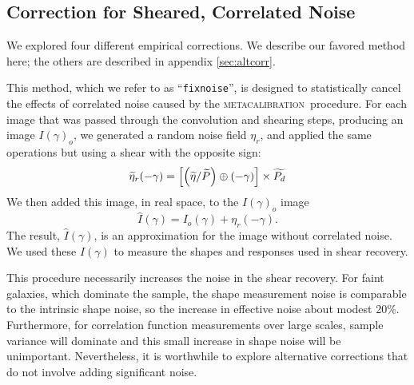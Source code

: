 \documentclass[iop]{emulateapj}
\newcommand{\mcal}{\textsc{metacalibration}}
\newcommand{\ntil}{\mbox{$\widetilde{\eta}$}}
\newcommand{\Ptil}{\mbox{$\widetilde{P}$}}
\newcommand{\Ptild}{\mbox{$\widetilde{P_d}$}}
\newcommand{\fixnoise}{\texttt{fixnoise}}
\begin{document}


\subsection{Correction for Sheared, Correlated Noise} \label{sec:fixnoise}


We explored four different empirical corrections.  We describe our favored
method here; the others are described in appendix \ref{sec:altcorr}.

This method, which we refer to as ``\fixnoise'', is designed to statistically
cancel the effects of correlated noise caused by the \mcal\ procedure.  For each
image that was passed through the convolution and shearing steps, producing
an image $I(\gamma)_o$, we generated a random noise field
$\eta_r$, and applied the same operations but using a shear with
the opposite sign:
\begin{equation}
    \widetilde{\eta}_r(-\gamma) = \left[ \left( \ntil/\Ptil \right) \oplus (-\gamma) \right] \times \Ptild  \nonumber \\
\end{equation}
We then added this image, in real space, to the $I(\gamma)_o$ image
\begin{equation}
    \hat{I}(\gamma) = I_o(\gamma) + \eta_r(-\gamma).
\end{equation}
The result, $\hat{I}(\gamma)$, is an approximation for the image
without correlated noise.
We used these $\hat{I}(\gamma)$ to measure the shapes and responses used in
shear recovery.  

This procedure necessarily increases the noise in the shear recovery.  For
faint galaxies, which dominate the sample, the shape measurement noise is
comparable to the intrinsic shape noise, so the increase in effective noise
about modest 20\%.  Furthermore, for correlation function measurements over
large scales, sample variance will dominate and this small increase in shape
noise will be unimportant.  Nevertheless, it is worthwhile to explore
alternative corrections that do not involve adding significant noise.
\end{document}
